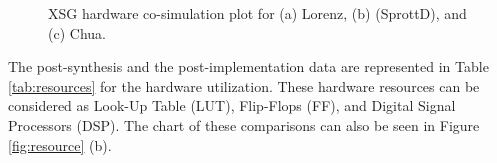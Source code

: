         \begin{figure}[ht]
        \centering
        \caption{XSG hardware co-simulation plot for (a) Lorenz, (b) (SprottD), and (c) Chua.}
        \label{fig:XSG}%
    \end{figure}

The post-synthesis and the post-implementation data are represented in Table \ref{tab:resources}  for the hardware utilization. These hardware resources can be considered as Look-Up Table (LUT), Flip-Flops (FF), and Digital Signal Processors (DSP). The chart of these comparisons can also be seen in Figure \ref{fig:resource} (b).

